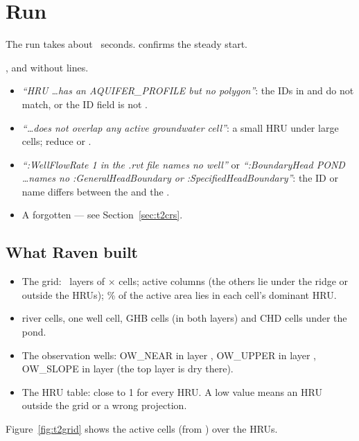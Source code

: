 \section{Run}
The run takes about ~seconds.  confirms the steady start.
\begin{tocheck}
, and  without  lines.
\end{tocheck}
\begin{trouble}
\begin{itemize}
\item \emph{``HRU \dots has an AQUIFER\_PROFILE but no polygon''}: the IDs in  and  do not
      match, or the ID field is not .
\item \emph{``\dots does not overlap any active groundwater cell''}: a small HRU under large cells; reduce
       or .
\item \emph{``:WellFlowRate 1 in the .rvt file names no well''} or \emph{``:BoundaryHead POND \dots names no
      :GeneralHeadBoundary or :SpecifiedHeadBoundary''}: the ID or name differs between the  and the .
\item A forgotten  --- see Section~\ref{sec:t2crs}.
\end{itemize}
\end{trouble}

\subsection{What Raven built}
\begin{tocheck}
\begin{itemize}
\item The grid: ~layers of $\times$ cells;  active columns (the
       others lie under the ridge or outside the HRUs); \% of the active area lies in
      each cell's dominant HRU.
\item {} river cells, one well cell,  GHB cells (in both layers) and  CHD
      cells under the pond.
\item The observation wells: OW\_NEAR in layer , OW\_UPPER in layer , OW\_SLOPE in layer
       (the top layer is dry there).
\item The HRU table:  close to 1 for every HRU. A low value means an HRU outside the grid
      or a wrong projection.
\end{itemize}
\end{tocheck}
Figure~\ref{fig:t2grid} shows the active cells (from ) over the HRUs.

